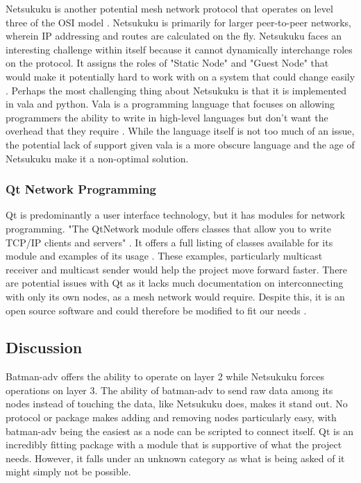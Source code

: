 \documentclass[onecolumn, draftclsnofoot,10pt, compsoc]{IEEEtran}
\begin{document}
Netsukuku is another potential mesh network protocol that operates on level three of the OSI model \cite{Netsukuku:title}. Netsukuku is primarily for larger peer-to-peer networks, wherein IP addressing and routes are calculated on the fly. Netsukuku faces an interesting challenge within itself because it cannot dynamically interchange roles on the protocol. It assigns the roles of "Static Node" and "Guest Node" that would make it potentially hard to work with on a system that could change easily \cite{Netsukuku:topology}. Perhaps the most challenging thing about Netsukuku is that it is implemented in vala and python. Vala is a programming language that focuses on allowing programmers the ability to write in high-level languages but don't want the overhead that they require \cite{Vala:intro}. While the language itself is not too much of an issue, the potential lack of support given vala is a more obscure language and the age of Netsukuku make it a non-optimal solution.

\subsubsection{Qt Network Programming}

Qt is predominantly a user interface technology, but it has modules for network programming. "The QtNetwork module offers classes that allow you to write TCP/IP clients and servers" \cite{QT:what}. It offers a full listing of classes available for its module and examples of its usage \cite{QT:examples}. These examples, particularly multicast receiver and multicast sender would help the project move forward faster. There are potential issues with Qt as it lacks much documentation on interconnecting with only its own nodes, as a mesh network would require. Despite this, it is an open source software and could therefore be modified to fit our needs \cite{QT:open}.

\subsection{Discussion}

Batman-adv offers the ability to operate on layer 2 while Netsukuku forces operations on layer 3. The ability of batman-adv to send raw data among its nodes instead of touching the data, like Netsukuku does, makes it stand out. No protocol or package makes adding and removing nodes particularly easy, with batman-adv being the easiest as a node can be scripted to connect itself. Qt is an incredibly fitting package with a module that is supportive of what the project needs. However, it falls under an unknown category as what is being asked of it might simply not be possible.
\end{document}
